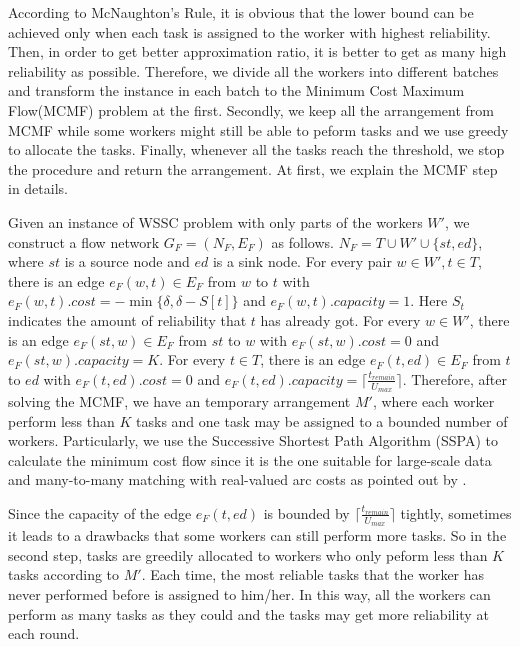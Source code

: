 According to McNaughton's Rule\cite{NaughtonRule}, it is obvious that the lower bound can be achieved only when each task is assigned to the worker with highest reliability.
Then, in order to get better approximation ratio, it is better to get as many high reliability as possible.
Therefore, we divide all the workers into different batches and transform the instance in each batch to the Minimum Cost Maximum Flow(MCMF) problem at the first.
Secondly, we keep all the arrangement from MCMF while some workers might still be able to peform tasks and we use greedy to allocate the tasks.
Finally, whenever all the tasks reach the threshold, we stop the procedure and return the arrangement.
At first, we explain the MCMF step in details.

Given an instance of WSSC problem with only parts of the workers $W'$, we construct a flow network $G_F = (N_F, E_F)$ as follows.
$N_F = T \cup W' \cup \{st, ed\}$, where $st$ is a source node and $ed$ is a sink node. 
For every pair $w \in W', t \in T$, there is an edge $e_F(w, t) \in E_F$ from $w$ to $t$ with 
$e_F(w, t).cost = -\min\{\delta, \delta-S[t]\}$ and $e_F(w, t).capacity = 1$.
Here $S_{t}$ indicates the amount of reliability that $t$ has already got. 
For every $w \in W'$, there is an edge $e_F(st, w) \in E_F$ from $st$ to $w$ with
$e_F(st, w).cost = 0$ and $e_F(st, w).capacity = K$.
For every $t \in T$, there is an edge $e_F(t, ed) \in E_F$ from $t$ to $ed$ with 
$e_F(t, ed).cost = 0$ and $e_F(t, ed).capacity = \lceil \frac{t_{remain}}{U_{max}} \rceil$.
Therefore, after solving the MCMF, we have an temporary arrangement $M'$,
where each worker perform less than $K$ tasks and one task may be assigned to a bounded number of workers.
Particularly, we use the Successive Shortest Path Algorithm (SSPA) to calculate the
minimum cost flow since it is the one suitable for large-scale data and many-to-many matching with real-valued arc costs as pointed out by \cite{yiu2008capacity}.

Since the capacity of the edge $e_F(t, ed)$ is bounded by $\lceil \frac{t_{remain}}{U_{max}} \rceil$ tightly, 
sometimes it leads to a drawbacks that some workers can still perform more tasks.
So in the second step, tasks are greedily allocated to workers who only peform less than $K$ tasks according to $M'$.
Each time, the most reliable tasks that the worker has never performed before is assigned to him/her.
In this way, all the workers can perform as many tasks as they could and the tasks may get more reliability at each round.

